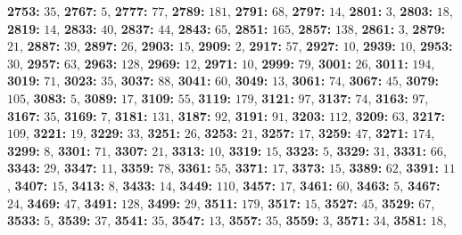 \textsf{\bfseries 2753:} $35$, \textsf{\bfseries 2767:} $5$, \textsf{\bfseries 2777:} $77$, \textsf{\bfseries 2789:} $181$, \textsf{\bfseries 2791:} $68$, \textsf{\bfseries 2797:} $14$, \textsf{\bfseries 2801:} $3$, \textsf{\bfseries 2803:} $18$, \textsf{\bfseries 2819:} $14$, \textsf{\bfseries 2833:} $40$, \textsf{\bfseries 2837:} $44$, \textsf{\bfseries 2843:} $65$, \textsf{\bfseries 2851:} $165$, \textsf{\bfseries 2857:} $138$, \textsf{\bfseries 2861:} $3$, \textsf{\bfseries 2879:} $21$, \textsf{\bfseries 2887:} $39$, \textsf{\bfseries 2897:} $26$, \textsf{\bfseries 2903:} $15$, \textsf{\bfseries 2909:} $2$, \textsf{\bfseries 2917:} $57$, \textsf{\bfseries 2927:} $10$, \textsf{\bfseries 2939:} $10$, \textsf{\bfseries 2953:} $30$, \textsf{\bfseries 2957:} $63$, \textsf{\bfseries 2963:} $128$, \textsf{\bfseries 2969:} $12$, \textsf{\bfseries 2971:} $10$, \textsf{\bfseries 2999:} $79$, \textsf{\bfseries 3001:} $26$, \textsf{\bfseries 3011:} $194$, \textsf{\bfseries 3019:} $71$, \textsf{\bfseries 3023:} $35$, \textsf{\bfseries 3037:} $88$, \textsf{\bfseries 3041:} $60$, \textsf{\bfseries 3049:} $13$, \textsf{\bfseries 3061:} $74$, \textsf{\bfseries 3067:} $45$, \textsf{\bfseries 3079:} $105$, \textsf{\bfseries 3083:} $5$, \textsf{\bfseries 3089:} $17$, \textsf{\bfseries 3109:} $55$, \textsf{\bfseries 3119:} $179$, \textsf{\bfseries 3121:} $97$, \textsf{\bfseries 3137:} $74$, \textsf{\bfseries 3163:} $97$, \textsf{\bfseries 3167:} $35$, \textsf{\bfseries 3169:} $7$, \textsf{\bfseries 3181:} $131$, \textsf{\bfseries 3187:} $92$, \textsf{\bfseries 3191:} $91$, \textsf{\bfseries 3203:} $112$, \textsf{\bfseries 3209:} $63$, \textsf{\bfseries 3217:} $109$, \textsf{\bfseries 3221:} $19$, \textsf{\bfseries 3229:} $33$, \textsf{\bfseries 3251:} $26$, \textsf{\bfseries 3253:} $21$, \textsf{\bfseries 3257:} $17$, \textsf{\bfseries 3259:} $47$, \textsf{\bfseries 3271:} $174$, \textsf{\bfseries 3299:} $8$, \textsf{\bfseries 3301:} $71$, \textsf{\bfseries 3307:} $21$, \textsf{\bfseries 3313:} $10$, \textsf{\bfseries 3319:} $15$, \textsf{\bfseries 3323:} $5$, \textsf{\bfseries 3329:} $31$, \textsf{\bfseries 3331:} $66$, \textsf{\bfseries 3343:} $29$, \textsf{\bfseries 3347:} $11$, \textsf{\bfseries 3359:} $78$, \textsf{\bfseries 3361:} $55$, \textsf{\bfseries 3371:} $17$, \textsf{\bfseries 3373:} $15$, \textsf{\bfseries 3389:} $62$, \textsf{\bfseries 3391:} $11$, \textsf{\bfseries 3407:} $15$, \textsf{\bfseries 3413:} $8$, \textsf{\bfseries 3433:} $14$, \textsf{\bfseries 3449:} $110$, \textsf{\bfseries 3457:} $17$, \textsf{\bfseries 3461:} $60$, \textsf{\bfseries 3463:} $5$, \textsf{\bfseries 3467:} $24$, \textsf{\bfseries 3469:} $47$, \textsf{\bfseries 3491:} $128$, \textsf{\bfseries 3499:} $29$, \textsf{\bfseries 3511:} $179$, \textsf{\bfseries 3517:} $15$, \textsf{\bfseries 3527:} $45$, \textsf{\bfseries 3529:} $67$, \textsf{\bfseries 3533:} $5$, \textsf{\bfseries 3539:} $37$, \textsf{\bfseries 3541:} $35$, \textsf{\bfseries 3547:} $13$, \textsf{\bfseries 3557:} $35$, \textsf{\bfseries 3559:} $3$, \textsf{\bfseries 3571:} $34$, \textsf{\bfseries 3581:} $18$, 
